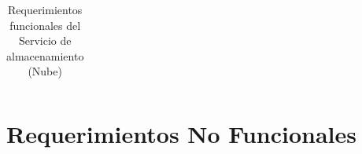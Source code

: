 \begin{table}[htb]
\begin{tabular}{| p{2cm} |  p{13.5cm} |}
\end{tabular}
\caption{Requerimientos funcionales del Servicio de almacenamiento (Nube)}
\label{Servicio de almacenamiento (Nube) }
\end{table}

\vspace{9cm}
\section{Requerimientos No Funcionales }
